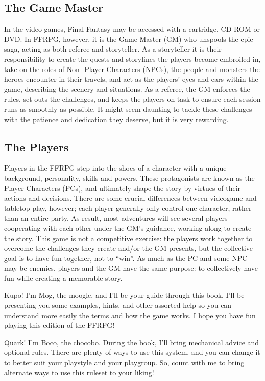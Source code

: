 \subsection{The Game Master}
In the video games, Final Fantasy may be
accessed with a cartridge, CD-ROM or DVD. In
FFRPG, however, it is the Game Master (GM) who
unspools the epic saga, acting as both referee and
storyteller. As a storyteller it is their responsibility
to create the quests and storylines the players
become embroiled in, take on the roles of Non-
Player Characters (NPCs), the people and
monsters the heroes encounter in their travels,
and act as the players' eyes and ears within the
game, describing the scenery and situations. As a
referee, the GM enforces the rules, set outs the
challenges, and keeps the players on task to ensure
each session runs as smoothly as possible. It might
seem daunting to tackle these challenges with the
patience and dedication they deserve, but it is very
rewarding.

\subsection{The Players}
Players in the FFRPG step into the shoes of a
character with a unique background, personality,
skills and powers. These protagonists are known
as the Player Characters (PCs), and ultimately
shape the story by virtues of their actions and
decisions. There are some crucial differences
between videogame and tabletop play, however;
each player generally only control one character,
rather than an entire party. As result, most
adventures will see several players cooperating
with each other under the GM's guidance, working
along to create the story. This game is not a
competitive exercise: the players work together to
overcome the challenges they create and/or the
GM presents, but the collective goal is to have fun
together, not to “win”. As much as the PC and some
NPC may be enemies, players and the GM have the
same purpose: to collectively have fun while
creating a memorable story.

Kupo! I'm Mog, the moogle, and I'll be your guide
through this book. I'll be presenting you some examples,
hints, and other assorted help so you can understand
more easily the terms and how the game works. I hope
you have fun playing this edition of the FFRPG!

Quark! I'm Boco, the chocobo. During the
book, I'll bring mechanical advice and optional
rules. There are plenty of ways to use this system,
and you can change it to better suit your playstyle
and your playgroup. So, count with me to bring
alternate ways to use this ruleset to your liking!

